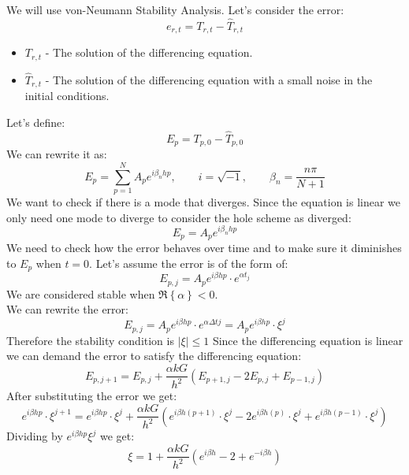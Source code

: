 \documentclass[11pt, a4paper]{article}
\begin{document}
\noindent We will use von-Neumann Stability Analysis. Let's consider the error:
\begin{equation}
    e_{r,t}=T_{r,t}-\hat{T}_{r,t}
\end{equation}
\begin{itemize}
    \item $T_{r,t}$ - The solution of the differencing equation.
    \item $\hat{T}_{r,t}$ - The solution of the differencing equation with a small noise in the initial conditions.
\end{itemize}
\noindent Let's define:
\begin{equation}
    E_p=T_{p,0}-\hat{T}_{p,0}
\end{equation}
We can rewrite it as:
\begin{equation}
    E_p=\sum_{p=1}^{N}A_pe^{i\beta_n h p},\qquad i=\sqrt{-1},\qquad\beta_n=\frac{n\pi}{N+1}
\end{equation}
We want to check if there is a mode that diverges. Since the equation is linear we only need one mode to diverge to consider the hole scheme as diverged:
\begin{equation}
    E_p=A_pe^{i\beta_n h p}
\end{equation}
We need to check how the error behaves over time and to make sure it diminishes to $E_p$ when $t=0$.
Let's assume the error is of the form of:
\begin{equation}
    E_{p,j}=A_pe^{i\beta h p}\cdot e^{\alpha t_j}
\end{equation}
We are considered stable when $\Re{\left\{\alpha\right\}}<0$. \\
We can rewrite the error:
\begin{equation}
    E_{p,j}=A_pe^{i\beta h p}\cdot e^{\alpha\Delta tj}=A_pe^{i\beta h p}\cdot\xi^j
\end{equation}
Therefore the stability condition is $\left|\xi\right|\le1$
Since the differencing equation is linear we can demand the error to satisfy the differencing equation:
\begin{equation}
    E_{p,j+1}=\displaystyle E_{p,j}+\frac{\alpha kG}{h^2}\left(E_{p+1,j}-2E_{p,j}+E_{p-1,j}\right)
\end{equation}
After substituting the error we get:
\begin{equation}
    e^{i\beta h p}\cdot\xi^{j+1}=\displaystyle e^{i\beta h p}\cdot\xi^j+\frac{\alpha kG}{h^2}\left(e^{i\beta h \left(p+1\right)}\cdot\xi^j-2e^{i\beta h \left(p\right)}\cdot\xi^j+e^{i\beta h \left(p-1\right)}\cdot\xi^j\right)
\end{equation}
Dividing by $e^{i\beta h p}\xi^j$ we get:
\begin{equation}
    \xi=\displaystyle 1+\frac{\alpha kG}{h^2}\left(e^{i\beta h }-2+e^{-i\beta h }\right)
\end{equation}
\end{document}
